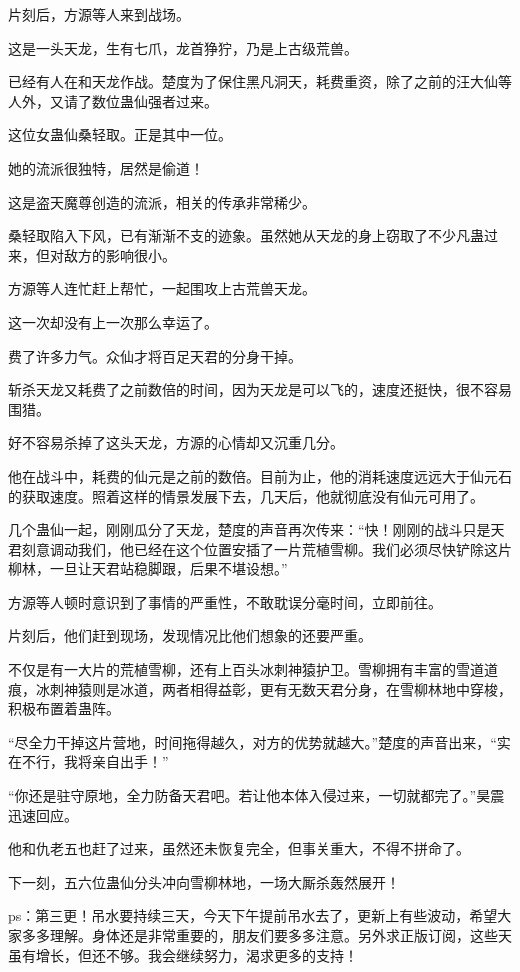 \begin{this_body}
片刻后，方源等人来到战场。

这是一头天龙，生有七爪，龙首狰狞，乃是上古级荒兽。

已经有人在和天龙作战。楚度为了保住黑凡洞天，耗费重资，除了之前的汪大仙等人外，又请了数位蛊仙强者过来。

这位女蛊仙桑轻取。正是其中一位。

她的流派很独特，居然是偷道！

这是盗天魔尊创造的流派，相关的传承非常稀少。

桑轻取陷入下风，已有渐渐不支的迹象。虽然她从天龙的身上窃取了不少凡蛊过来，但对敌方的影响很小。

方源等人连忙赶上帮忙，一起围攻上古荒兽天龙。

这一次却没有上一次那么幸运了。

费了许多力气。众仙才将百足天君的分身干掉。

斩杀天龙又耗费了之前数倍的时间，因为天龙是可以飞的，速度还挺快，很不容易围猎。

好不容易杀掉了这头天龙，方源的心情却又沉重几分。

他在战斗中，耗费的仙元是之前的数倍。目前为止，他的消耗速度远远大于仙元石的获取速度。照着这样的情景发展下去，几天后，他就彻底没有仙元可用了。

几个蛊仙一起，刚刚瓜分了天龙，楚度的声音再次传来：“快！刚刚的战斗只是天君刻意调动我们，他已经在这个位置安插了一片荒植雪柳。我们必须尽快铲除这片柳林，一旦让天君站稳脚跟，后果不堪设想。”

方源等人顿时意识到了事情的严重性，不敢耽误分毫时间，立即前往。

片刻后，他们赶到现场，发现情况比他们想象的还要严重。

不仅是有一大片的荒植雪柳，还有上百头冰刺神猿护卫。雪柳拥有丰富的雪道道痕，冰刺神猿则是冰道，两者相得益彰，更有无数天君分身，在雪柳林地中穿梭，积极布置着蛊阵。

“尽全力干掉这片营地，时间拖得越久，对方的优势就越大。”楚度的声音出来，“实在不行，我将亲自出手！”

“你还是驻守原地，全力防备天君吧。若让他本体入侵过来，一切就都完了。”昊震迅速回应。

他和仇老五也赶了过来，虽然还未恢复完全，但事关重大，不得不拼命了。

下一刻，五六位蛊仙分头冲向雪柳林地，一场大厮杀轰然展开！

ps：第三更！吊水要持续三天，今天下午提前吊水去了，更新上有些波动，希望大家多多理解。身体还是非常重要的，朋友们要多多注意。另外求正版订阅，这些天虽有增长，但还不够。我会继续努力，渴求更多的支持！

\end{this_body}

